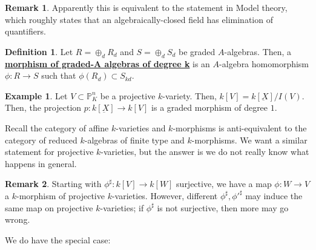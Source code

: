 \documentclass{article}
\theoremstyle{definition}
\theoremstyle{definition}
\newtheorem{definition}{Definition}[theorem]
\theoremstyle{definition}
\newtheorem{remark}{Remark}[theorem]
\theoremstyle{definition}
\theoremstyle{definition}
\theoremstyle{definition}
\theoremstyle{definition}
\newtheorem{example}{Example}[theorem]
\begin{document}
\begin{tcolorbox}[colback=green!5!white,colframe=green!30!white]
\begin{remark}
Apparently this is equivalent to the statement in Model theory, which roughly states that an algebraically-closed field has elimination of quantifiers. 
\end{remark}
\end{tcolorbox}



\begin{tcolorbox}[colback=purple!5!white,colframe=purple!75!black]
\begin{definition}
Let $R=\oplus_d R_d$ and $S=\oplus_d S_d$ be graded $A$-algebras. Then, a \underline{\textbf{morphism of graded-A algebras of degree k}} is an $A$-algebra homomorphism $\phi: R\to S$ such that $\phi(R_d)\subset S_{kd}$. 
\end{definition}
\end{tcolorbox}


\begin{tcolorbox}[colback=yellow!5!white,colframe=yellow!30!white]
\begin{example}
Let $V\subset \mathbb{P}^n_K$ be a projective $k$-variety. Then, $k[V]=k[\underbar{X}]/I(V)$. Then, the projection $p: k[\underbar{X}]\to k[V]$ is a graded morphism of degree $1$. 
\end{example}
\end{tcolorbox}

Recall the category of affine $k$-varieties and $k$-morphisms is anti-equivalent to the category of reduced $k$-algebras of finite type and $k$-morphisms. We want a similar statement for projective $k$-varieties, but the answer is we do not really know what happens in general.

\begin{tcolorbox}[colback=green!5!white,colframe=green!30!white]
    \begin{remark}
    Starting with $\phi^{\sharp}: k[V]\to k[W]$ surjective, we have a map $\phi: W\to V$ a $k$-morphism of projective $k$-varieties. However, different $\phi^{\sharp}, \phi'^{\sharp}$ may induce the same map on projective $k$-varieties; if $\phi^{\sharp}$ is not surjective, then more may go wrong. 
    \end{remark}
    \end{tcolorbox}
    
    
    We do have the special case:
\end{document}
